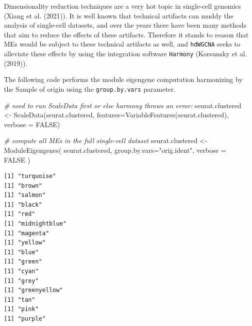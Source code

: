 \documentclass[
  letterpaper,
  DIV=11,
  numbers=noendperiod]{scrartcl}
\newenvironment{Shaded}{}{}
\newcommand{\AttributeTok}[1]{\textcolor[rgb]{0.49,0.56,0.16}{#1}}
\newcommand{\CommentTok}[1]{\textcolor[rgb]{0.38,0.63,0.69}{\textit{#1}}}
\newcommand{\ConstantTok}[1]{\textcolor[rgb]{0.53,0.00,0.00}{#1}}
\newcommand{\FunctionTok}[1]{\textcolor[rgb]{0.02,0.16,0.49}{#1}}
\newcommand{\NormalTok}[1]{#1}
\newcommand{\OtherTok}[1]{\textcolor[rgb]{0.00,0.44,0.13}{#1}}
\newcommand{\StringTok}[1]{\textcolor[rgb]{0.25,0.44,0.63}{#1}}
\begin{document}
Dimensionality reduction techniques are a very hot topic in single-cell
genomics (Xiang et al. (2021)). It is well known that technical
artifacts can muddy the analysis of single-cell datasets, and over the
years there have been many methods that aim to reduce the effects of
these artifacts. Therefore it stands to reason that MEs would be subject
to these technical artifacts as well, and \texttt{hdWGCNA} seeks to
alleviate these effects by using the integration software
\texttt{Harmony} (Korsunsky et al. (2019)).

The following code performs the module eigengene computation harmonizing
by the Sample of origin using the \texttt{group.by.vars} parameter.

\begin{Shaded}
\begin{Highlighting}[]
\CommentTok{\# need to run ScaleData first or else harmony throws an error:}
\NormalTok{seurat.clustered }\OtherTok{\textless{}{-}} \FunctionTok{ScaleData}\NormalTok{(seurat.clustered, }
                              \AttributeTok{features=}\FunctionTok{VariableFeatures}\NormalTok{(seurat.clustered), }
                              \AttributeTok{verbose =} \ConstantTok{FALSE}\NormalTok{)}
\end{Highlighting}
\end{Shaded}

\begin{Shaded}
\begin{Highlighting}[]
\CommentTok{\# compute all MEs in the full single{-}cell dataset}
\NormalTok{seurat.clustered }\OtherTok{\textless{}{-}} \FunctionTok{ModuleEigengenes}\NormalTok{( }
\NormalTok{ seurat.clustered,}
 \AttributeTok{group.by.vars=}\StringTok{"orig.ident"}\NormalTok{,}
 \AttributeTok{verbose =} \ConstantTok{FALSE}
\NormalTok{)}
\end{Highlighting}
\end{Shaded}

\begin{verbatim}
[1] "turquoise"
[1] "brown"
[1] "salmon"
[1] "black"
[1] "red"
[1] "midnightblue"
[1] "magenta"
[1] "yellow"
[1] "blue"
[1] "green"
[1] "cyan"
[1] "grey"
[1] "greenyellow"
[1] "tan"
[1] "pink"
[1] "purple"
\end{verbatim}
\end{document}
